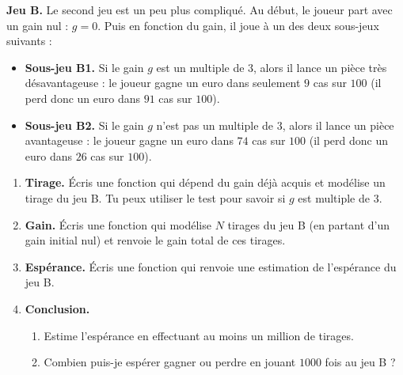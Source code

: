 \documentclass[11pt,class=report,crop=false]{standalone}
\begin{document}


\begin{activite}


\textbf{Jeu B.} Le second jeu est un peu plus compliqué. Au début, le joueur part avec un gain nul : $g=0$. Puis en fonction du gain, il joue à un des deux sous-jeux suivants :
\begin{itemize}
  \item \textbf{Sous-jeu B1.} Si le gain $g$ est un multiple de $3$, alors il lance un pièce très désavantageuse : le joueur gagne un euro dans seulement $9$ cas sur $100$ (il perd donc un euro dans $91$ cas sur $100$).
  
  \item \textbf{Sous-jeu B2.} Si le gain $g$ n'est pas un multiple de $3$, alors il lance un pièce avantageuse : le joueur gagne un euro dans $74$ cas sur $100$ (il perd donc un euro dans $26$ cas sur $100$).
\end{itemize}

\begin{enumerate}
  \item \textbf{Tirage.}
  \'Ecris une fonction  qui dépend du gain déjà acquis et modélise un tirage du jeu B. Tu peux utiliser le test  pour savoir si $g$ est multiple de $3$.
  
  \item \textbf{Gain.} \'Ecris une fonction  qui modélise $N$ tirages du jeu B (en partant d'un gain initial nul) et renvoie le gain total de ces tirages.
  
 
  
  \item \textbf{Espérance.} \'Ecris une fonction  qui renvoie une estimation de l'espérance du jeu B.
  
  \item \textbf{Conclusion.}
  \begin{enumerate}
    \item Estime l'espérance en effectuant au moins un million de tirages.
    \item Combien puis-je espérer gagner ou perdre en jouant $1000$ fois au jeu B ?
  \end{enumerate}

\end{enumerate}

\end{activite}
\end{document}
